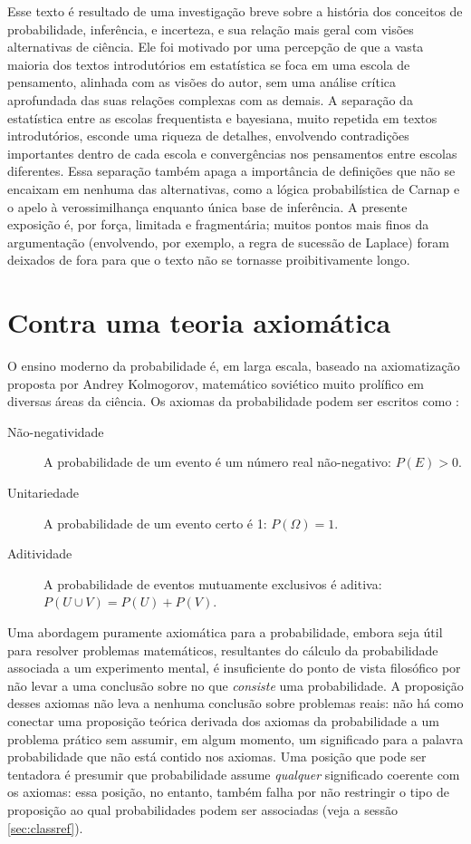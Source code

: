 Esse texto é resultado de uma investigação breve sobre a história dos conceitos de probabilidade, inferência, e incerteza,
e sua relação mais geral com visões alternativas de ciência. Ele foi motivado por uma percepção de que a vasta maioria dos
textos introdutórios em estatística se foca em uma escola de pensamento, alinhada com as visões do autor, sem uma análise crítica
aprofundada das suas relações complexas com as demais. A separação da estatística entre as escolas frequentista e bayesiana,
muito repetida em textos introdutórios, esconde uma riqueza de detalhes, envolvendo contradições importantes dentro de cada
escola e convergências nos pensamentos entre escolas diferentes. Essa separação também apaga a importância de definições que
não se encaixam em nenhuma das alternativas, como a lógica probabilística de Carnap e o apelo à verossimilhança enquanto 
única base de inferência. A presente exposição é, por força, limitada e fragmentária; muitos pontos mais finos da argumentação
(envolvendo, por exemplo, a regra de sucessão de Laplace) foram deixados de fora para que o texto não se tornasse proibitivamente
longo. 

\section{Contra uma teoria axiomática}\label{sec:axiomatica}
O ensino moderno da probabilidade é, em larga escala, baseado na axiomatização proposta por Andrey Kolmogorov, matemático
soviético muito prolífico em diversas áreas da ciência. Os axiomas da probabilidade podem ser escritos como \citep{Morettin09}:

\begin{description}
	\item[Não-negatividade] A probabilidade de um evento é um número real não-negativo: $P(E) > 0$.
	\item[Unitariedade] A probabilidade de um evento certo é 1: $P(\Omega) = 1$.
	\item[Aditividade] A probabilidade de eventos mutuamente exclusivos é aditiva: $P(U \cup V) = P(U)+P(V)$.
\end{description}

Uma abordagem puramente axiomática para a probabilidade, embora seja útil para resolver problemas matemáticos, resultantes do
cálculo da probabilidade associada a um experimento mental, é insuficiente do ponto de vista filosófico por não 
levar a uma conclusão sobre no que {\em consiste} uma probabilidade. A proposição desses axiomas não leva a nenhuma conclusão 
sobre problemas reais: não há como conectar uma proposição teórica derivada dos axiomas da probabilidade a um problema
prático sem assumir, em algum momento, um significado para a palavra probabilidade que não está contido nos axiomas. Uma posição
que pode ser tentadora é presumir que probabilidade assume {\em qualquer} significado coerente com os axiomas: essa posição,
no entanto, também falha por não restringir o tipo de proposição ao qual probabilidades podem ser associadas (veja a sessão
\ref{sec:classref}). 

